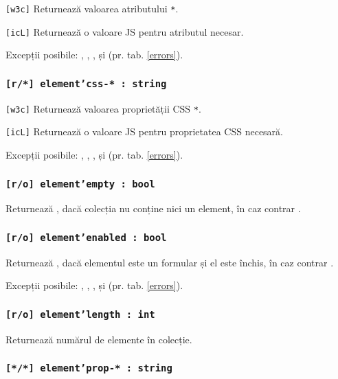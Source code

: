 \texttt{[w3c]} Returnează valoarea atributului \texttt{*}.

\texttt{[icL]} Returnează o valoare JS pentru atributul necesar.

Excepții posibile: , , ,  și  (pr. tab. \ref{errors}).

\subsubsection{\texttt{[r/*] element'css-* : string}}

\texttt{[w3c]} Returnează valoarea proprietății CSS \texttt{*}.

\texttt{[icL]} Returnează o valoare JS pentru proprietatea CSS necesară.

Excepții posibile: , , ,  și  (pr. tab. \ref{errors}).

\subsubsection{\texttt{[r/o] element'empty : bool}}

Returnează \true, dacă colecția nu conține nici un element, în caz contrar \false.

\subsubsection{\texttt{[r/o] element'enabled : bool}}

Returnează \false, dacă elementul este un formular și el este închis, în caz contrar \true.

Excepții posibile: , , ,  și  (pr. tab. \ref{errors}).

\subsubsection{\texttt{[r/o] element'length : int}}

Returnează numărul de elemente în colecție.

\subsubsection{\texttt{[*/*] element'prop-* : string}}

